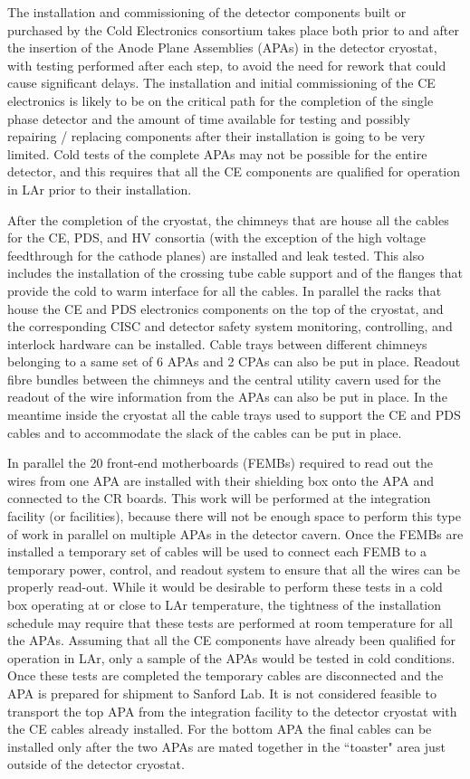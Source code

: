 The installation and commissioning of the detector components built or
purchased by the Cold Electronics consortium takes place both prior to
and after the insertion of the Anode Plane Assemblies (APAs) in the
detector cryostat, with testing performed after each step, to avoid the
need for rework that could cause significant delays. The installation and
initial commissioning of the CE electronics is likely to be on the critical
path for the completion of the single phase detector and the amount of
time available for testing and possibly repairing / replacing components
after their installation is going to be very limited. Cold tests of the
complete APAs may not be possible for the entire detector, and this requires
that all the CE components are qualified for operation in LAr prior to their
installation.

After the completion of the cryostat, the chimneys that are house all the
cables for the CE, PDS, and HV consortia (with the exception of the high
voltage feedthrough for the cathode planes) are installed and leak tested.
This also includes the installation of the crossing tube cable support and of
the flanges that provide the cold to warm interface for all the cables.
In parallel the racks that house the CE and PDS electronics components on
the top of the cryostat, and the corresponding CISC and detector safety
system monitoring, controlling, and interlock hardware can be installed.
Cable trays between different chimneys belonging to a same set of 6 APAs
and 2 CPAs can also be put in place. Readout fibre bundles between the
chimneys and the central utility cavern used for the readout of the wire
information from the APAs can also be put in place. In the meantime inside
the cryostat all the cable trays used to support the CE and PDS cables and to
accommodate the slack of the cables can be put in place.

In parallel the 20 front-end motherboards (FEMBs) required to read out the
wires from one APA are installed with their shielding box onto the APA and
connected to the CR boards. This work will be performed at the integration
facility (or facilities), because there will not be enough space to perform
this type of work in parallel on multiple APAs in the detector cavern. Once
the FEMBs are installed a temporary set of cables will be
used to connect each FEMB to a temporary power, control, and readout system
to ensure that all the wires can be properly read-out. While it would be
desirable to perform these tests in a cold box operating at or close to LAr
temperature, the tightness of the installation schedule may require that these
tests are performed at room temperature for all the APAs. Assuming that all
the CE components have already been qualified for operation in LAr, only a
sample of the APAs would be tested in cold conditions. Once these tests
are completed the temporary cables are disconnected and the APA is prepared
for shipment to Sanford Lab. It is not considered feasible to transport the
top APA from the integration facility to the detector cryostat with the
CE cables already installed. For the bottom APA the final cables can be
installed only after the two APAs are mated together in the ``toaster" area
just outside of the detector cryostat.

